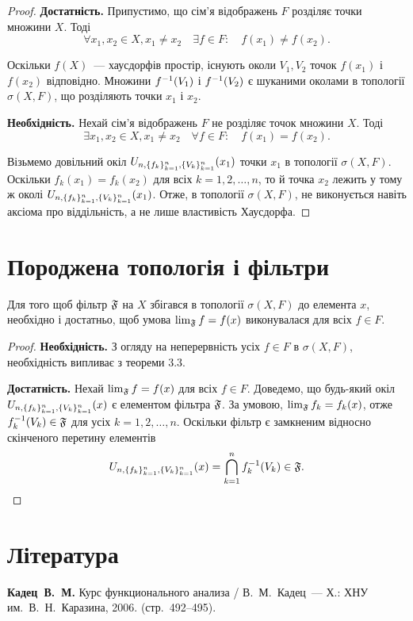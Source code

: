 \begin{proof}
    \textbf{Достатність.} Припустимо, що сім'я відображень $F$ розділяє точки множини $X$. Тоді
    \begin{equation*}
        \forall x_1, x_2 \in X, x_1 \ne x_2 \quad \exists f \in F: \quad f(x_1) \ne f(x_2).
    \end{equation*}

    Оскільки $f(X)$~--- хаусдорфів простір, існують околи $V_1, V_2$ точок $f(x_1)$ і $f(x_2)$ відповідно. Множини $f\inv (V_1)$ і $f\inv (V_2)$ є шуканими околами в топології $\sigma (X, F)$, що розділяють точки $x_1$ і $x_2$.

    \textbf{Необхідність.} Нехай сім'я відображень $F$ не розділяє точок множини $X$. Тоді
    \begin{equation*}
        \exists x_1, x_2 \in X, x_1 \ne x_2 \quad \forall f \in F: \quad f(x_1) = f(x_2).
    \end{equation*}

    Візьмемо довільний окіл $\InducedNeighbourhood{x_1}$ точки $x_1$ в топології $\sigma (X, F)$. Оскільки $f_k(x_1) = f_k(x_2)$ для всіх $k = 1, 2, \dots, n$, то й точка $x_2$ лежить у тому ж околі $\InducedNeighbourhood{x_1}$. Отже, в топології $\sigma (X, F)$, не виконується навіть аксіома про віддільність, а не лише властивість Хаусдорфа.
\end{proof}

\section{Породжена топологія і фільтри}

\begin{theorem}
    Для того щоб фільтр $\frak F$ на $X$ збігався в топології $\sigma (X, F)$ до елемента $x$, необхідно і достатньо, щоб умова $\lim_{\frak F} f = f(x)$ виконувалася для всіх $f \in F$.
\end{theorem}
\begin{proof}
    \textbf{Необхідність.} З огляду на неперервність усіх $f \in F$ в $\sigma (X, F)$, необхідність випливає з теореми 3.3.

    \textbf{Достатність.} Нехай $\lim_{\frak F} f = f(x)$ для всіх $f \in F$. Доведемо, що будь-який окіл $\InducedNeighbourhood{x}$ є елементом фільтра $\frak F$. За умовою, $\lim_{\frak F} f_k = f_k(x)$, отже $f_k\inv (V_k) \in \frak F$ для усіх $k = 1, 2, \dots, n$. Оскільки фільтр є замкненим відносно скінченого перетину елементів
    \begin{equation*}
        \InducedNeighbourhood{x} = \Bigcap_{k = 1}^n f_k\inv (V_k) \in \frak F. \qedhere
    \end{equation*}
\end{proof}

\section{Література}

\begin{enumerate}[label={[\arabic*]}]
\item \textbf{Кадец~В.~М.}
Курс функционального анализа /
В.~М.~Кадец~---
Х.: ХНУ им.~В.~Н.~Каразина, 2006. (стр.~492--495).
\end{enumerate}
